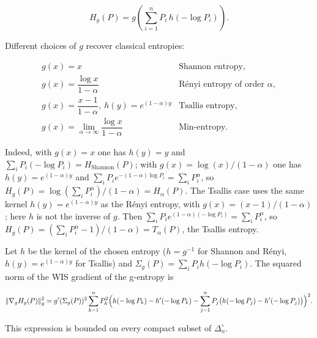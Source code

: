 \[
H_g(P) = g\!\left(\sum_{i=1}^n P_i\, h(-\log P_i)\right).
\]

Different choices of \(g\) recover classical entropies:

\[
\begin{array}{ll}
g(x)=x & \text{Shannon entropy}, \\[2pt]
g(x)=\dfrac{\log x}{1-\alpha} & \text{R\'enyi entropy of order }\alpha, \\[2pt]
g(x)=\dfrac{x-1}{1-\alpha},\ h(y)=e^{(1-\alpha)y} & \text{Tsallis entropy}, \\[2pt]
g(x)=\lim_{\alpha\to\infty}\dfrac{\log x}{1-\alpha} & \text{Min-entropy}.
\end{array}
\]

Indeed, with \(g(x)=x\) one has \(h(y)=y\) and
\(\sum_i P_i(-\log P_i)=H_{\mathrm{Shannon}}(P)\); with
\(g(x)=\log(x)/(1-\alpha)\) one has \(h(y)=e^{(1-\alpha)y}\) and
\(\sum_i P_i e^{-(1-\alpha)\log P_i}=\sum_i P_i^\alpha\), so
\(H_g(P)=\log(\sum_i P_i^\alpha)/(1-\alpha)=H_\alpha(P)\).
The Tsallis case uses the same kernel \(h(y)=e^{(1-\alpha)y}\) as the R\'enyi
entropy, with \(g(x)=(x-1)/(1-\alpha)\); here \(h\) is not the inverse of \(g\).
Then \(\sum_i P_i e^{(1-\alpha)(-\log P_i)}=\sum_i P_i^\alpha\), so
\(H_g(P)=(\sum_i P_i^\alpha-1)/(1-\alpha)=T_\alpha(P)\), the Tsallis entropy.

\begin{theorem}
\label{ch:thm:g-entropy-gradient}
Let \(h\) be the kernel of the chosen entropy (\(h=g^{-1}\) for Shannon and
R\'enyi, \(h(y)=e^{(1-\alpha)y}\) for Tsallis) and
\(\Sigma_g(P)=\sum_i P_i h(-\log P_i)\).
The squared norm of the WIS gradient of the g-entropy is

\[
\|\nabla_g H_g(P)\|_g^2
=
g'(\Sigma_g(P))^2
\sum_{k=1}^n
P_k^2
\Bigl(
h(-\log P_k)-h'(-\log P_k)
-\sum_{j=1}^n P_j\bigl(h(-\log P_j)-h'(-\log P_j)\bigr)
\Bigr)^2.
\]

This expression is bounded on every compact subset of \(\Delta_n^\circ\).
\end{theorem}

